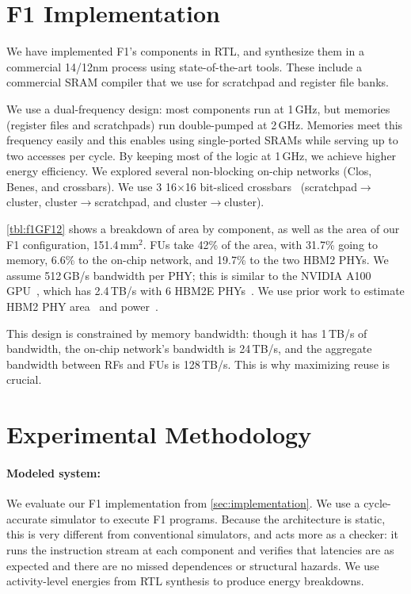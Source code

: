 \section{F1 Implementation}
\label{sec:f1_implementation}

We have implemented F1's components in RTL, and synthesize them in a commercial
14/12nm process using state-of-the-art tools. These include a commercial SRAM
compiler that we use for scratchpad and register file banks.

We use a dual-frequency design: most components run at 1\,GHz, but memories
(register files and scratchpads) run double-pumped at 2\,GHz. Memories meet
this frequency easily and this enables using single-ported SRAMs while serving
up to two accesses per cycle. By keeping most of the logic at 1\,GHz, we
achieve higher energy efficiency. We explored several non-blocking on-chip
networks (Clos, Benes, and crossbars). We use 3 16$\times$16 bit-sliced
crossbars~\cite{passas:tocaid12:crossbar} (scratch\-pad$\rightarrow$cluster,
cluster$\rightarrow$scratchpad, and cluster$\rightarrow$cluster).

\autoref{tbl:f1GF12} shows a breakdown of area by component, as well as the
area of our F1 configuration, 151.4\,mm$^2$. FUs take 42\% of the area, with
31.7\% going to memory, 6.6\% to the on-chip network, and 19.7\% to the two
HBM2 PHYs. We assume 512\,GB/s bandwidth per PHY; this is similar to the NVIDIA
A100 GPU~\cite{choquette2021nvidia}, which has 2.4\,TB/s with 6 HBM2E
PHYs~\cite{nvidiadgx}. We use prior work to estimate HBM2 PHY
area~\cite{rambuswhite, dasgupta20208} and power~\cite{rambuswhite,
ge2011design}.

This design is constrained by memory bandwidth: though it has 1\,TB/s of
bandwidth, the on-chip network's bandwidth is 24\,TB/s, and the aggregate
bandwidth between RFs and FUs is 128\,TB/s. This is why maximizing reuse is
crucial.

\section{Experimental Methodology}
\label{sec:f1_methodology}

\paragraph{Modeled system:}
We evaluate our F1 implementation from \autoref{sec:implementation}. We use a
cycle-accurate simulator to execute F1 programs. Because the architecture is
static, this is very different from conventional simulators, and acts more as a
checker: it runs the instruction stream at each component and verifies that
latencies are as expected and there are no missed dependences or structural
hazards. We use activity-level energies from RTL synthesis to produce energy
breakdowns.

